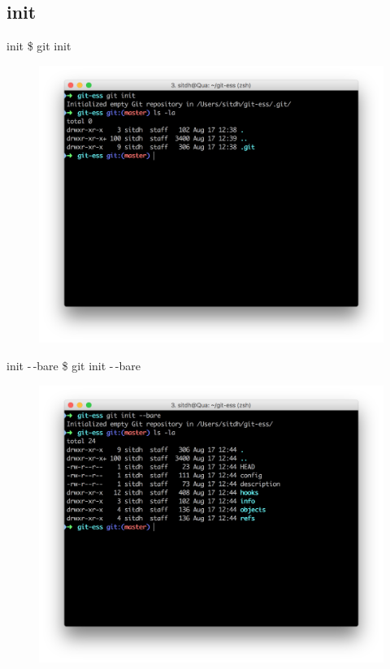 \documentclass{beamer}
\begin{document}
\subsection{init}
\begin{frame}{init}
    \Large{\$ git init}
    \begin{figure}
        \center
        \includegraphics[width=.9\textwidth]{git-init}
        \label{fig:git-init}
    \end{figure}
\end{frame}

\begin{frame}{init -\,-bare}
    \Large{\$ git init -\,-bare}
    \begin{figure}
        \center
        \includegraphics[width=.9\textwidth]{git-init--bare}
        \label{fig:git-init--bare}
    \end{figure}
\end{frame}
\end{document}
